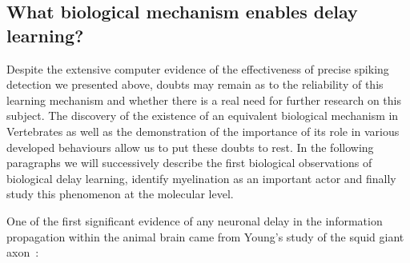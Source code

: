 \documentclass[brainsci, %
               review,submit,pdftex,moreauthors
               ]{Definitions/mdpi}
\begin{document}
\subsection{What biological mechanism enables delay learning?}

Despite the extensive computer evidence of the effectiveness of precise spiking detection we presented above, doubts may remain as to the reliability of this learning mechanism and whether there is a real need for further research on this subject. The discovery of the existence of an equivalent biological mechanism in Vertebrates as well as the demonstration of the importance of its role in various developed behaviours allow us to put these doubts to rest. In the following paragraphs we will successively describe the first biological observations of biological delay learning, identify myelination as an important actor and finally study this phenomenon at the molecular level. 


One of the first significant evidence of any neuronal delay in the information propagation within the animal brain came from Young's study of the squid giant axon~\cite{young_1938}:
\end{document}
